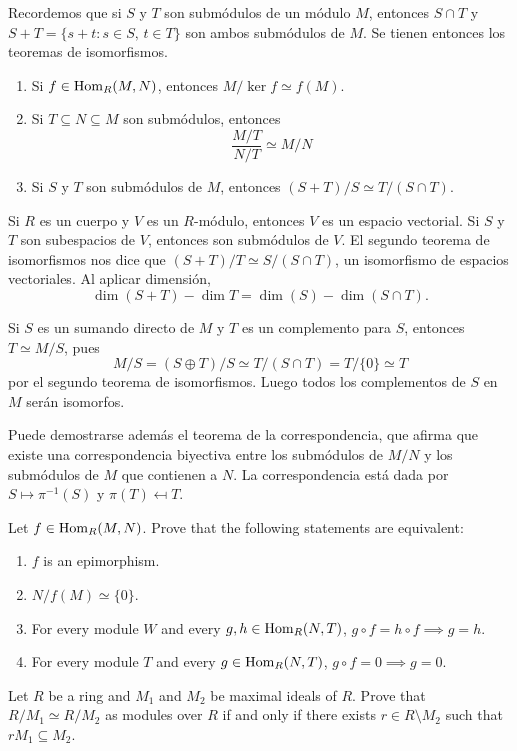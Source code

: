 Recordemos que si $S$ y $T$ son submódulos de un módulo $M$, entonces
$S\cap T$ y $S+T=\{s+t:s\in S,\,t\in T\}$ son ambos submódulos de $M$. 
Se tienen entonces los teoremas de isomorfismos. 
\begin{enumerate}
	\item Si $f\in\operatorname{Hom}_R(M,N)$, entonces $M/\ker f\simeq f(M)$.
	\item Si $T\subseteq N\subseteq M$ son submódulos, entonces 
	\[
	\frac{M/T}{N/T}\simeq M/N
	\]
	\item Si $S$ y $T$ son submódulos de $M$, entonces $(S+T)/S\simeq T/(S\cap T)$. 
\end{enumerate}

\begin{example}
Si $R$ es un cuerpo y $V$ es un $R$-módulo, entonces $V$ es un espacio vectorial. 
Si $S$ y $T$ son subespacios de $V$, entonces son submódulos de $V$. 
El segundo teorema de isomorfismos nos dice que $(S+T)/T\simeq S/(S\cap T)$, 
un isomorfismo de espacios vectoriales. Al aplicar dimensión, 
\[
\dim(S+T)-\dim T=\dim(S)-\dim(S\cap T).
\]
\end{example}

\begin{example}
Si $S$ es un sumando directo de $M$ y $T$ es un complemento para $S$, entonces $T\simeq M/S$, pues
\[
M/S=(S\oplus T)/S\simeq T/(S\cap T)=T/\{0\}\simeq T
\]
por el segundo teorema de isomorfismos. Luego todos los complementos
de $S$ en $M$ serán isomorfos.  	
\end{example}

Puede demostrarse además el teorema de la correspondencia, que afirma que existe una correspondencia biyectiva 
entre los submódulos de $M/N$ y los submódulos de $M$ que contienen a $N$. La correspondencia está dada
por $S\mapsto \pi^{-1}(S)$ y $\pi(T)\mapsfrom T$. 


\begin{exercise}
Let $f\in\operatorname{Hom}_R(M,N)$. Prove that the following statements are equivalent: 
\begin{enumerate}
\item $f$ is an epimorphism.
\item $N/f(M)\simeq\{0\}$. 
\item For every module $W$ and every $g,h\in\operatorname{Hom}_R(N,T)$, $g\circ f=h\circ f\implies g=h$.
\item For every module $T$ and every $g\in\operatorname{Hom}_R(N,T)$, $g\circ f=0\implies g=0$. 
\end{enumerate}
\end{exercise}

\begin{exercise}
\label{xca:mod_iso_max}
    Let $R$ be a ring and $M_1$ and $M_2$ be maximal ideals of $R$. Prove that
    $R/M_1\simeq R/M_2$ as modules over $R$ if and only if there exists
    $r\in R\setminus M_2$ such that $rM_1\subseteq M_2$. 
\end{exercise}



